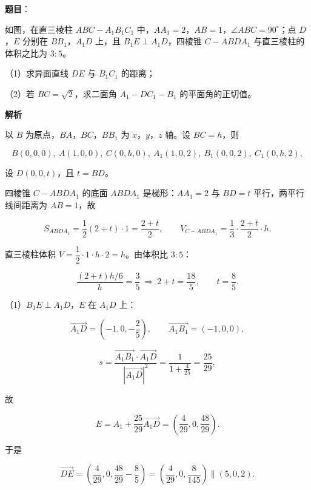\begin{answer}

\textbf{题目}：

如图，在直三棱柱 $ABC-A_1B_1C_1$ 中，$AA_1=2$，$AB=1$，$\angle ABC=90^\circ$；点 $D$，$E$ 分别在 $BB_1$，$A_1D$ 上，且 $B_1E\perp A_1D$，四棱锥 $C-ABDA_1$ 与直三棱柱的体积之比为 $3:5$。

（1）求异面直线 $DE$ 与 $B_1C_1$ 的距离；

（2）若 $BC=\sqrt2$，求二面角 $A_1-DC_1-B_1$ 的平面角的正切值。
\nopagebreak[4]
\begin{center}\end{center}
\nopagebreak[4]
\textbf{解析}

以 $B$ 为原点，$BA$，$BC$，$BB_1$ 为 $x$，$y$，$z$ 轴。设 $BC=h$，则

\nopagebreak[4]
\[B(0,0,0),\ A(1,0,0),\ C(0,h,0),\ A_1(1,0,2),\ B_1(0,0,2),\ C_1(0,h,2),\]

设 $D(0,0,t)$，且 $t=BD$。

四棱锥 $C-ABDA_1$ 的底面 $ABDA_1$ 是梯形：$AA_1=2$ 与 $BD=t$ 平行，两平行线间距离为 $AB=1$，故

\nopagebreak[4]
\[S_{ABDA_1}=\frac12(2+t)\cdot1=\frac{2+t}2,\qquad V_{C-ABDA_1}=\frac13\cdot\frac{2+t}2\cdot h.\]

直三棱柱体积 $V=\dfrac12\cdot1\cdot h\cdot2=h$。由体积比 $3:5$：

\nopagebreak[4]
\[\frac{(2+t)h/6}{h}=\frac35\ \Longrightarrow\ 2+t=\frac{18}5,\qquad t=\frac85.\]

（1）$B_1E\perp A_1D$，$E$ 在 $A_1D$ 上：

\nopagebreak[4]
\[\overrightarrow{A_1D}=\left(-1,0,-\frac25\right),\qquad \overrightarrow{A_1B_1}=(-1,0,0),\]

\nopagebreak[4]
\[s=\frac{\overrightarrow{A_1B_1}\cdot\overrightarrow{A_1D}}{\left|\overrightarrow{A_1D}\right|^2}
=\frac1{1+\frac4{25}}=\frac{25}{29},\]

故

\nopagebreak[4]
\[E=A_1+\frac{25}{29}\overrightarrow{A_1D}=\left(\frac4{29},0,\frac{48}{29}\right).\]

于是

\nopagebreak[4]
\[\overrightarrow{DE}=\left(\frac4{29},0,\frac{48}{29}-\frac85\right)=\left(\frac4{29},0,\frac8{145}\right)\parallel(5,0,2).\]


\end{answer}

